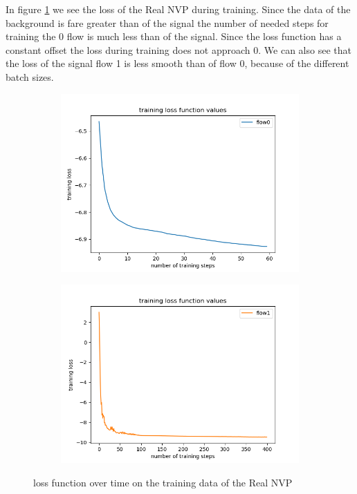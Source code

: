 \documentclass[%
 reprint,
 amsmath,amssymb,
 aps,
]{revtex4-2}
\begin{document}
In figure \ref{fig:losst} we see the loss of the Real NVP during training. Since the data of the background is fare greater than of the signal the number of needed steps for training the 0 flow is much less than of the signal. Since the loss function has a constant offset the loss during training does not approach 0. We can also see that the loss of the signal flow 1 is less smooth than of flow 0, because of the different batch sizes.

 \begin{figure}[ht]
	\centering
	\begin{subfigure}[h]{0.4\textwidth}
		\centering
		\includegraphics[width=\textwidth]{figs/training_loss_0_Real_NVP.png}   
	\end{subfigure}
	\hfill
	\begin{subfigure}[h]{0.4\textwidth}  
		\centering 
		\includegraphics[width=\textwidth]{figs/training_loss_1_Real_NVP.png}
	\end{subfigure}
	\caption[ loss function over time on the training data of the Real NVP]
	{\small loss function over time on the training data of the Real NVP} 
	\label{fig:losst}
\end{figure}
\end{document}
